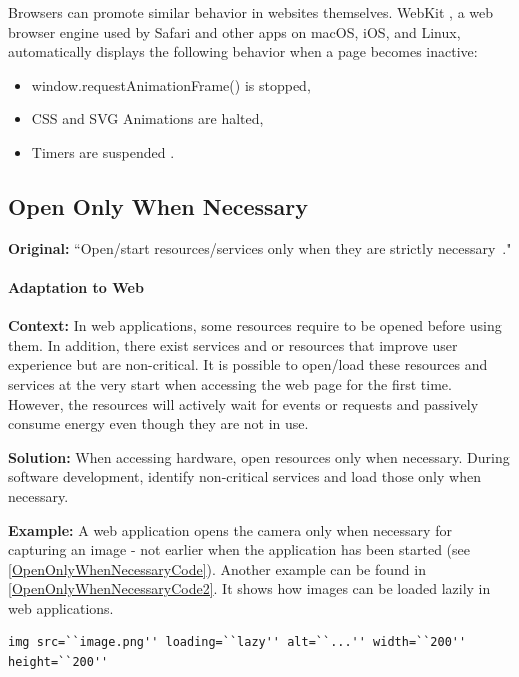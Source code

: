 Browsers can promote similar behavior in websites themselves. WebKit \cite{webkit-website}, a web browser engine used by Safari and other apps on macOS, iOS, and Linux, automatically displays the following behavior when a page becomes inactive: 
\begin{itemize}
    \item window.requestAnimationFrame() is stopped,
    \item CSS and SVG Animations are halted,
    \item Timers are suspended \cite{webkit-blog}.
\end{itemize}


\subsection{Open Only When Necessary} \label{sec:patterns-OpenOnlyWhenNecessary}
\textbf{Original:} ``Open/start resources/services only when they are strictly necessary~\cite{cruz2019catalog}."

\paragraph{Adaptation to Web}\mbox{}

\textbf{Context:} In web applications, some resources require to be opened before using them. In addition, there exist services and or resources that improve user experience but are non-critical. It is possible to open/load these resources and services at the very start when accessing the web page for the first time. However, the resources will actively wait for events or requests and passively consume energy even though they are not in use.

\textbf{Solution:} When accessing hardware, open resources only when necessary. During software development, identify non-critical services and load those only when necessary.

\textbf{Example:} A web application opens the camera only when necessary for capturing an image - not earlier when the application has been started (see \autoref{OpenOnlyWhenNecessaryCode}). Another example can be found in \autoref{OpenOnlyWhenNecessaryCode2}. It shows how images can be loaded lazily in web applications.

\begin{minipage}{\linewidth}
    \begin{lstlisting}[caption={Code snippet showing the usage of the loading attribute to lazy-load images \cite{lazy-loading-code-example}}, label={OpenOnlyWhenNecessaryCode2}]
img src=``image.png'' loading=``lazy'' alt=``...'' width=``200'' height=``200''
\end{lstlisting}
\end{minipage}

